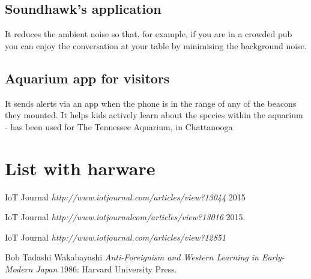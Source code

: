 \documentclass[12pt]{article}
\begin{document}
\subsection {Soundhawk's application} It reduces the ambient noise so that, for example, if you are in a crowded pub you can enjoy the conversation at your table by minimising the background noise.

 \subsection {Aquarium app for visitors} It sends alerts via an app when the phone is in the range of any of the beacons they mounted. It helps kids actively learn about the species within the aquarium -  has been used for The Tennessee Aquarium, in Chattanooga \cite {norman}



 \section {List with harware}



\begin{thebibliography}{1}

   IoT Journal {\em http://www.iotjournal.com/articles/view?13044} 2015

    IoT Journal {\em http://www.iotjournalcom/articles/view?13016} 2015.

   IoT Journal {\em http://www.iotjournal.com/articles/view?12851} 

   Bob Tadashi Wakabayashi {\em Anti-Foreignism and Western
  Learning in Early-Modern Japan} 1986: Harvard University Press.

  \end{thebibliography}
\end{document}
